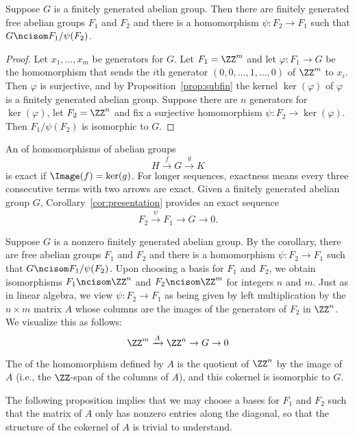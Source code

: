 \begin{corollary}
  \label{cor:presentation}
  Suppose $G$ is a finitely generated abelian group. Then there are
  finitely generated free abelian groups $F_1$ and $F_2$ and there is
  a homomorphism $\psi:F_2 \to F_1$ such that $G \ncisom F_1/\psi(F_2)$.
\end{corollary}
\begin{proof}
  Let $x_1,\dots, x_m$ be generators for $G$. Let $F_1=\ZZ^m$ and let
  $\varphi:F_1\to G$ be the homomorphism that sends the $i$th generator
  $(0,0,\dots,1,\dots,0)$ of $\ZZ^m$ to $x_i$. Then $\varphi$ is
  surjective, and by Proposition~\ref{prop:subfin} the
  kernel $\ker(\varphi)$ of $\varphi$ is a finitely generated abelian
  group. Suppose there are $n$ generators for $\ker(\varphi)$, let
  $F_2 = \ZZ^n$ and fix a surjective homomorphism $\psi:F_2
  \to \ker(\varphi)$. Then $F_1 / \psi(F_2)$ is isomorphic to $G$.
\end{proof}

An  of homomorphisms of abelian groups
\[
  H \xrightarrow{f} G \xrightarrow{g} K
\]
is exact if $\Image(f) = \ker(g)$.
For longer sequences, exactness means every three consecutive
terms with two arrows are exact.
Given a finitely generated abelian group $G$,
Corollary~\ref{cor:presentation} provides an exact sequence
\[
  F_2 \xrightarrow{\psi} F_1 \to G \to 0.
\]

Suppose $G$ is a nonzero finitely generated abelian group.  By the
corollary, there are free abelian groups $F_1$ and $F_2$ and there is a
homomorphism $\psi:F_2 \to F_1$ such that $G\ncisom F_1/\psi(F_2)$.
Upon choosing a basis for $F_1$ and $F_2$, we obtain isomorphisms
$F_1\ncisom \ZZ^n$ and $F_2\ncisom \ZZ^m$ for integers $n$ and $m$.
Just as in linear algebra, we view $\psi:F_2\to F_1$ as being given
by left multiplication by the $n\times m$ matrix $A$ whose columns
are the images of the generators of $F_2$ in $\ZZ^n$.  We visualize
this as follows:
\[
  \ZZ^m \xrightarrow{A} \ZZ^n \to G \to 0
\]

The  of the homomorphism defined by $A$ is the quotient
of $\ZZ^n$ by the image of $A$ (i.e., the $\ZZ$-span of the columns of $A$),
and this cokernel is isomorphic to $G$.

The following proposition implies that we may choose a bases for $F_1$
and $F_2$ such that the matrix of $A$ only has nonzero entries along
the diagonal, so that the structure of the cokernel of $A$ is
trivial to understand.

